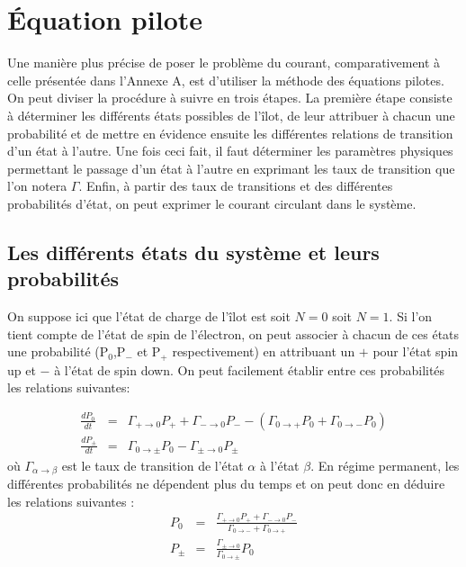 \chapter{\'Equation pilote}
Une manière plus précise de poser le problème du courant, comparativement à celle présentée dans l'Annexe A, est d'utiliser la méthode des équations pilotes. On peut diviser la procédure à suivre en trois étapes. La première étape consiste à déterminer les différents états possibles de l'\^ilot, de leur attribuer à chacun une probabilité et de mettre en évidence ensuite les différentes relations de transition d'un état à l'autre. Une fois ceci fait, il faut déterminer les paramètres physiques permettant le passage d'un état à l'autre en exprimant les taux de transition que l'on notera $\Gamma$. Enfin, à partir des taux de transitions et des différentes probabilités d'état, on peut exprimer le courant circulant dans le système.

\section{Les différents états du système et leurs probabilités}
On suppose ici que l'état de charge de l'\^ilot est soit $N=0$ soit $N=1$. Si l'on tient compte de l'état de spin de l'électron, on peut associer à chacun de ces états une probabilité (P$_0$,P$_-$ et P$_+$ respectivement) en attribuant un $+$ pour l'état spin up et $-$ à l'état de spin down. On peut facilement établir entre ces probabilités les relations suivantes:

\begin{eqnarray}
\frac{dP_0}{dt} &=& \Gamma_{+ \rightarrow 0}P_+ + \Gamma_{- \rightarrow 0}P_-  -(\Gamma_{0 \rightarrow +}P_0 + \Gamma_{0 \rightarrow -}P_0) \nonumber \\
\frac{dP_\pm}{dt} &=& \Gamma_{0 \rightarrow \pm}P_0 - \Gamma_{\pm \rightarrow 0}P_\pm \nonumber
\end{eqnarray}
où $\Gamma_{\alpha \rightarrow \beta}$ est le taux de transition de l'état $\alpha$ à l'état $\beta$. En régime permanent, les différentes probabilités ne dépendent plus du temps et on peut donc en déduire les relations suivantes :
\begin{eqnarray}
P_0 &=& \frac{\Gamma_{+ \rightarrow 0}P_{+} + \Gamma_{- \rightarrow 0}P_{-}}{\Gamma_{0 \rightarrow -} + \Gamma_{0 \rightarrow +} }\\
P_{\pm} &=& \frac{\Gamma_{\pm \rightarrow 0}}{\Gamma_{0 \rightarrow \pm}}P_0 
\end{eqnarray}

